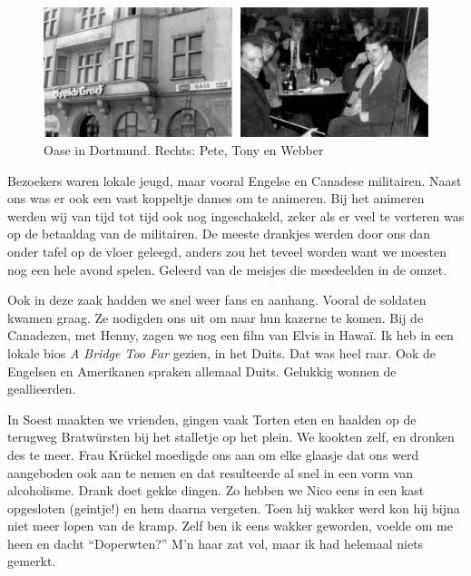 \documentclass[10pt,twoside, openright]{memoir}
\begin{document}
\begin{figure}
\includegraphics[width=\textwidth]{img/ch29/double}
\caption*{\footnotesize Oase in Dortmund. Rechts: Pete, Tony en Webber}
\end{figure}

Bezoekers waren lokale jeugd, maar vooral Engelse en Canadese militairen. Naast ons was er ook een vast koppeltje dames om te animeren. Bij het animeren werden wij van tijd tot tijd ook nog ingeschakeld, zeker als er veel te verteren was op de betaaldag van de militairen. De meeste drankjes werden door ons dan onder tafel op de vloer geleegd, anders zou het teveel worden want we moesten nog een hele avond spelen. Geleerd van de meisjes die meedeelden in de omzet. 

Ook in deze zaak hadden we snel weer fans en aanhang. Vooral de soldaten kwamen graag. Ze nodigden ons uit om naar hun kazerne te komen. Bij de Canadezen, met Henny, zagen we nog een film van Elvis in Hawaï. Ik heb in een lokale bios \emph{A Bridge Too Far} gezien, in het Duits. Dat was heel raar. Ook de Engelsen en Amerikanen spraken allemaal Duits. Gelukkig wonnen de geallieerden.

In Soest maakten we vrienden, gingen vaak Torten eten en haalden op de terugweg Bratwürsten bij het stalletje op het plein. We kookten zelf, en dronken des te meer. Frau Krückel moedigde ons aan om elke glaasje dat ons werd aangeboden ook aan te nemen en dat resulteerde al snel in een vorm van alcoholisme. Drank doet gekke dingen. Zo hebben we Nico eens in een kast opgesloten (geintje!) en hem daarna vergeten. Toen hij wakker werd kon hij bijna niet meer lopen van de kramp. Zelf ben ik eens wakker geworden, voelde om me heen en dacht ``Doperwten?'' M’n haar zat vol, maar ik had helemaal niets gemerkt. 
\end{document}
